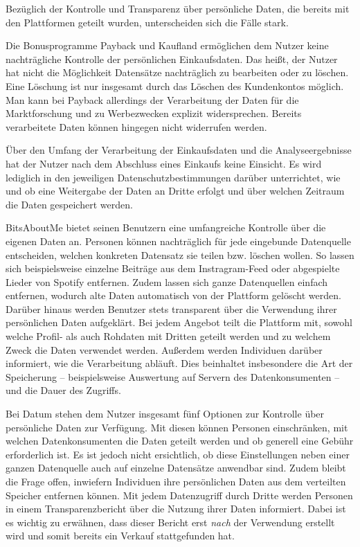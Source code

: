 \noindent Bezüglich der Kontrolle und Transparenz über persönliche Daten, die bereits mit den Plattformen geteilt wurden, unterscheiden sich die Fälle stark. \newline

\noindent Die Bonusprogramme Payback und Kaufland ermöglichen dem Nutzer keine nachträgliche Kontrolle der persönlichen Einkaufsdaten. Das heißt, der Nutzer hat nicht die Möglichkeit Datensätze nachträglich zu bearbeiten oder zu löschen. Eine Löschung ist nur insgesamt durch das Löschen des Kundenkontos möglich. Man kann bei Payback allerdings der Verarbeitung der Daten für die Marktforschung und zu Werbezwecken explizit widersprechen. Bereits verarbeitete Daten können hingegen nicht widerrufen werden. \newline

\noindent Über den Umfang der Verarbeitung der Einkaufsdaten und die Analyseergebnisse hat der Nutzer nach dem Abschluss eines Einkaufs keine Einsicht. Es wird lediglich in den jeweiligen Datenschutzbestimmungen darüber unterrichtet, wie und ob eine Weitergabe der Daten an Dritte erfolgt und über welchen Zeitraum die Daten gespeichert werden. \newline

\noindent BitsAboutMe bietet seinen Benutzern eine umfangreiche Kontrolle über die eigenen Daten an. Personen können nachträglich für jede eingebunde Datenquelle entscheiden, welchen konkreten Datensatz sie teilen bzw. löschen wollen. So lassen sich beispielsweise einzelne Beiträge aus dem Instragram-Feed oder abgespielte Lieder von Spotify entfernen. Zudem lassen sich ganze Datenquellen einfach entfernen, wodurch alte Daten automatisch von der Plattform gelöscht werden. Darüber hinaus werden Benutzer stets transparent über die Verwendung ihrer persönlichen Daten aufgeklärt. Bei jedem Angebot teilt die Plattform mit, sowohl welche Profil- als auch Rohdaten mit Dritten geteilt werden und zu welchem Zweck die Daten verwendet werden. Außerdem werden Individuen darüber informiert, wie die Verarbeitung abläuft. Dies beinhaltet insbesondere die Art der Speicherung -- beispielsweise Auswertung auf Servern des Datenkonsumenten -- und die Dauer des Zugriffs. \newline

\noindent Bei Datum stehen dem Nutzer insgesamt fünf Optionen zur Kontrolle über persönliche Daten zur Verfügung. Mit diesen können Personen einschränken, mit welchen Datenkonsumenten die Daten geteilt werden und ob generell eine Gebühr erforderlich ist. Es ist jedoch nicht ersichtlich, ob diese Einstellungen neben einer ganzen Datenquelle auch auf einzelne Datensätze anwendbar sind. Zudem bleibt die Frage offen, inwiefern Individuen ihre persönlichen Daten aus dem verteilten Speicher entfernen können. Mit jedem Datenzugriff durch Dritte werden Personen in einem Transparenzbericht über die Nutzung ihrer Daten informiert. Dabei ist es wichtig zu erwähnen, dass dieser Bericht erst \textit{nach} der Verwendung erstellt wird und somit bereits ein Verkauf stattgefunden hat. \newline

